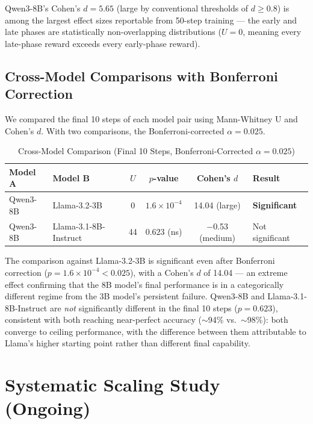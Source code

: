 \documentclass[12pt,a4paper]{report}
\theoremstyle{definition}
\begin{document}
Qwen3-8B's Cohen's $d = 5.65$ (large by conventional thresholds of $d \geq 0.8$) is among the largest effect sizes reportable from 50-step training --- the early and late phases are statistically non-overlapping distributions ($U = 0$, meaning every late-phase reward exceeds every early-phase reward).

\subsection{Cross-Model Comparisons with Bonferroni Correction}

We compared the final 10 steps of each model pair using Mann-Whitney U and Cohen's $d$.  With two comparisons, the Bonferroni-corrected $\alpha = 0.025$.

\begin{table}[htbp]
\centering
\caption{Cross-Model Comparison (Final 10 Steps, Bonferroni-Corrected $\alpha = 0.025$)}
\label{tab:cross_model}
\begin{tabular}{llcccl}
\toprule
\textbf{Model A} & \textbf{Model B} & $U$ & $p$-value & Cohen's $d$ & Result \\
\midrule
Qwen3-8B & Llama-3.2-3B          & 0   & $1.6 \times 10^{-4}$ & 14.04 (large) & \textbf{Significant} \\
Qwen3-8B & Llama-3.1-8B-Instruct & 44  & $0.623$ (ns)         & $-$0.53 (medium) & Not significant \\
\bottomrule
\end{tabular}
\end{table}

The comparison against Llama-3.2-3B is significant even after Bonferroni correction ($p = 1.6 \times 10^{-4} < 0.025$), with a Cohen's $d$ of 14.04 --- an extreme effect confirming that the 8B model's final performance is in a categorically different regime from the 3B model's persistent failure.  Qwen3-8B and Llama-3.1-8B-Instruct are \emph{not} significantly different in the final 10 steps ($p = 0.623$), consistent with both reaching near-perfect accuracy ($\sim$94\% vs.\ $\sim$98\%): both converge to ceiling performance, with the difference between them attributable to Llama's higher starting point rather than different final capability.

\section{Systematic Scaling Study (Ongoing)}
\label{sec:systematic_study}
\end{document}
